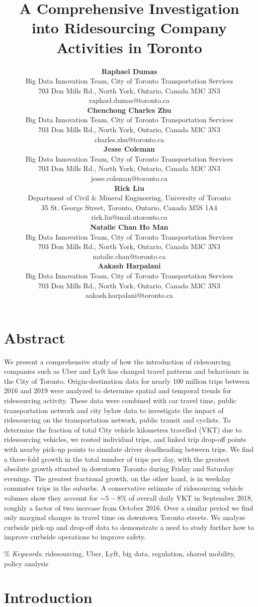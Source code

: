 \documentclass[]{trbunofficial_bdit_final}
\title{A Comprehensive Investigation into Ridesourcing Company
Activities in Toronto}
\author{%
  \textbf{Raphael Dumas}\\
  Big Data Innovation Team, City of Toronto Transportation Services\\
  703 Don Mills Rd., North York, Ontario, Canada M3C 3N3\\
  raphael.dumas@toronto.ca\\
  \hfill\break%
  \textbf{Chenchong Charles Zhu}\\
  Big Data Innovation Team, City of Toronto Transportation Services\\
  703 Don Mills Rd., North York, Ontario, Canada M3C 3N3\\
  charles.zhu@toronto.ca\\
  \hfill\break%
  \textbf{Jesse Coleman}\\
  Big Data Innovation Team, City of Toronto Transportation Services\\
  703 Don Mills Rd., North York, Ontario, Canada M3C 3N3\\
  jesse.coleman@toronto.ca\\
  \hfill\break%
  \textbf{Rick Liu}\\
  Department of Civil \& Mineral Engineering, University of Toronto\\
  35 St. George Street, Toronto, Ontario, Canada M5S 1A4\\
  rick.liu@mail.utoronto.ca\\
  \hfill\break%
  \textbf{Natalie Chan Ho Man}\\
  Big Data Innovation Team, City of Toronto Transportation Services\\
  703 Don Mills Rd., North York, Ontario, Canada M3C 3N3\\
  natalie.chan@toronto.ca\\
  \hfill\break%
  \textbf{Aakash Harpalani}\\
  Big Data Innovation Team, City of Toronto Transportation Services\\
  703 Don Mills Rd., North York, Ontario, Canada M3C 3N3\\
  aakash.harpalani@toronto.ca
}
\begin{document}
\maketitle

\hypertarget{abstract}{%
\section{Abstract}\label{abstract}}

We present a comprehensive study of how the introduction of ridesourcing
companies such as Uber and Lyft has changed travel patterns and behaviours in
the City of Toronto. Origin-destination data for nearly 100 million trips
between 2016 and 2019 were analyzed to determine spatial and temporal trends
for ridesourcing activity. These data were combined with car travel time,
public transportation network and city bylaw data to investigate the impact
of ridesourcing on the transportation network, public transit and cyclists.
To determine the fraction of total City vehicle kilometres travelled (VKT) due to
ridesourcing vehicles, we routed individual trips, and linked trip drop-off
points with nearby pick-up points to simulate driver deadheading between trips.
We find a three-fold growth in the total number of trips per day, with the
greatest absolute growth situated in downtown Toronto during Friday and
Saturday evenings. The greatest fractional growth, on the other hand, is in
weekday commuter trips in the suburbs. A conservative estimate of ridesourcing
vehicle volumes show they account for \(\sim 5 - 8\%\) of overall daily VKT in
September 2018, roughly a factor of two increase from October 2016. Over a
similar period we find only marginal changes in travel time on downtown Toronto
streets. We analyze curbside pick-up and drop-off data to demonstrate a need to
study further how to improve curbside operations to improve safety.

\hfill\break\%
\noindent\textit{Keywords}: ridesourcing, Uber, Lyft, big data, regulation,
shared mobility, policy analysis

\hypertarget{introduction}{%
\section{Introduction}\label{introduction}}
\end{document}
